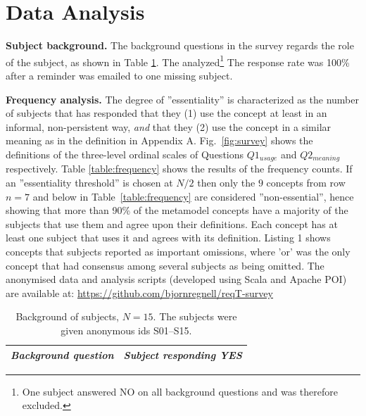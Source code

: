 \documentclass[a4paper]{llncs}
\begin{document}
\section{Data Analysis}

\textbf{Subject background.} The background questions in the survey regards the role of the subject, as shown in Table \ref{table:background}. The analyzed\footnote{One subject answered NO on all background questions and was therefore excluded.}  The response rate was 100\% after a reminder was emailed to one missing subject. %

\textbf{Frequency analysis.} The degree of ''essentiality'' is characterized as the number of subjects that has responded that they (1) use the concept at least in an informal, non-persistent way, \textit{and} that they (2) use the concept in a similar meaning as in the definition in Appendix A. Fig.~\ref{fig:survey} shows the definitions of the three-level ordinal scales of Questions $Q1_{usage}$  and $Q2_{meaning}$ respectively. Table \ref{table:frequency} shows the results of the frequency counts.  
If an ''essentiality threshold'' is chosen at $N/2$ then only the $9$ concepts from row $n = 7$ and below in Table~\ref{table:frequency} are considered ''non-essential'', hence showing that more than 90\% of the metamodel concepts have a majority of the subjects that use them and agree upon their definitions. Each concept has at least one subject that uses it and agrees with its definition. Listing 1 shows concepts that subjects reported as important omissions, where 'or' was the only concept that had consensus among several subjects as being omitted. {The anonymised data and analysis scripts (developed using Scala and Apache POI) are available at: \footnotesize\url{https://github.com/bjornregnell/reqT-survey}} 
\vspace{-0.4cm}

\begingroup
\begin{table}[H]
\setlength{\tabcolsep}{4pt} %
\renewcommand{\arraystretch}{1.4} %
\centering
\fontsize{8.5}{9}\selectfont
\caption{Background of subjects, $N = 15$. The subjects were given anonymous ids S01--S15.}
\label{table:background}
\begin{tabular}{p{}| p{}}
\textit{Background question} & \textit{Subject responding YES}  \\ \hline

 \end{tabular}
\end{table}
\endgroup
\end{document}
